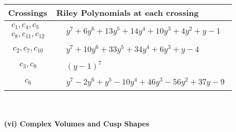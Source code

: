\documentclass[1p]{elsarticle_modified}
\theoremstyle{definition}
\begin{document}
\begin{tabular}{m{50pt}|m{274pt}}
Crossings & \hspace{64pt}Riley Polynomials at each crossing \\
\hline $$\begin{aligned}c_{1},c_{4},c_{5}\\c_{8},c_{11},c_{12}\end{aligned}$$&$\begin{aligned}
&y^7+6 y^6+13 y^5+14 y^4+10 y^3+4 y^2+y-1
\end{aligned}$\\
\hline $$\begin{aligned}c_{2},c_{7},c_{10}\end{aligned}$$&$\begin{aligned}
&y^7+10 y^6+33 y^5+34 y^4+6 y^3+y-4
\end{aligned}$\\
\hline $$\begin{aligned}c_{3},c_{9}\end{aligned}$$&$\begin{aligned}
&(y-1)^7
\end{aligned}$\\
\hline $$\begin{aligned}c_{6}\end{aligned}$$&$\begin{aligned}
&y^7-2 y^6+y^5-10 y^4+46 y^3-56 y^2+37 y-9
\end{aligned}$\\
\hline
\end{tabular}\\~\\
\newpage\flushleft \textbf{(vi) Complex Volumes and Cusp Shapes}
\end{document}
